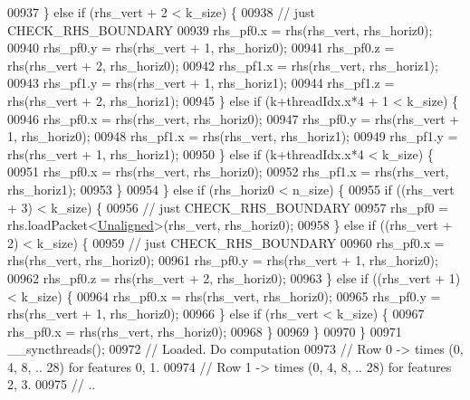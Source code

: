 \begin{DoxyCode}
00937         \} \textcolor{keywordflow}{else} \textcolor{keywordflow}{if} (rhs\_vert + 2 < k\_size) \{
00938           \textcolor{comment}{// just CHECK\_RHS\_BOUNDARY}
00939           rhs\_pf0.x = rhs(rhs\_vert, rhs\_horiz0);
00940           rhs\_pf0.y = rhs(rhs\_vert + 1, rhs\_horiz0);
00941           rhs\_pf0.z = rhs(rhs\_vert + 2, rhs\_horiz0);
00942           rhs\_pf1.x = rhs(rhs\_vert, rhs\_horiz1);
00943           rhs\_pf1.y = rhs(rhs\_vert + 1, rhs\_horiz1);
00944           rhs\_pf1.z = rhs(rhs\_vert + 2, rhs\_horiz1);
00945         \} \textcolor{keywordflow}{else} \textcolor{keywordflow}{if} (k+threadIdx.x*4 + 1 < k\_size) \{
00946           rhs\_pf0.x = rhs(rhs\_vert, rhs\_horiz0);
00947           rhs\_pf0.y = rhs(rhs\_vert + 1, rhs\_horiz0);
00948           rhs\_pf1.x = rhs(rhs\_vert, rhs\_horiz1);
00949           rhs\_pf1.y = rhs(rhs\_vert + 1, rhs\_horiz1);
00950         \} \textcolor{keywordflow}{else} \textcolor{keywordflow}{if} (k+threadIdx.x*4  < k\_size) \{
00951           rhs\_pf0.x = rhs(rhs\_vert, rhs\_horiz0);
00952           rhs\_pf1.x = rhs(rhs\_vert, rhs\_horiz1);
00953         \}
00954       \} \textcolor{keywordflow}{else} \textcolor{keywordflow}{if} (rhs\_horiz0 < n\_size) \{
00955         \textcolor{keywordflow}{if} ((rhs\_vert + 3) < k\_size) \{
00956           \textcolor{comment}{// just CHECK\_RHS\_BOUNDARY}
00957           rhs\_pf0 = rhs.loadPacket<\hyperlink{group__enums_gga45fe06e29902b7a2773de05ba27b47a1ac935220b4c844108e183ebe30a4d5204}{Unaligned}>(rhs\_vert, rhs\_horiz0);
00958         \} \textcolor{keywordflow}{else} \textcolor{keywordflow}{if} ((rhs\_vert + 2) < k\_size) \{
00959           \textcolor{comment}{// just CHECK\_RHS\_BOUNDARY}
00960           rhs\_pf0.x = rhs(rhs\_vert, rhs\_horiz0);
00961           rhs\_pf0.y = rhs(rhs\_vert + 1, rhs\_horiz0);
00962           rhs\_pf0.z = rhs(rhs\_vert + 2, rhs\_horiz0);
00963         \} \textcolor{keywordflow}{else} \textcolor{keywordflow}{if} ((rhs\_vert + 1) < k\_size) \{
00964           rhs\_pf0.x = rhs(rhs\_vert, rhs\_horiz0);
00965           rhs\_pf0.y = rhs(rhs\_vert + 1, rhs\_horiz0);
00966         \} \textcolor{keywordflow}{else} \textcolor{keywordflow}{if} (rhs\_vert  < k\_size) \{
00967           rhs\_pf0.x = rhs(rhs\_vert, rhs\_horiz0);
00968         \}
00969       \}
00970     \}
00971     \_\_syncthreads();
00972     \textcolor{comment}{// Loaded. Do computation}
00973     \textcolor{comment}{// Row 0 -> times (0, 4, 8, .. 28) for features 0, 1.}
00974     \textcolor{comment}{// Row 1 -> times (0, 4, 8, .. 28) for features 2, 3.}
00975     \textcolor{comment}{// ..}

\end{DoxyCode}
